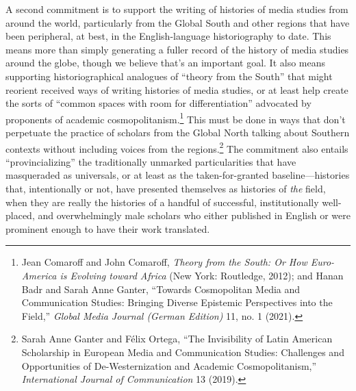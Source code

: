 \documentclass{tufte-handout}
\begin{document}
A second commitment is to support the writing of histories of media
studies from around the world, particularly from the Global South and
other regions that have been peripheral, at best, in the
English-language historiography to date. This means more than simply
generating a fuller record of the history of media studies around the
globe, though we believe that's an important goal. It also means
supporting historiographical analogues of ``theory from the South'' that
might reorient received ways of writing histories of media studies, or
at least help create the sorts of ``common spaces with room for
differentiation'' advocated by proponents of academic
cosmopolitanism.\footnote{Jean Comaroff and John Comaroff, \emph{Theory from the South: Or How
  Euro-America is Evolving toward Africa} (New York: Routledge, 2012);
  and Hanan Badr and Sarah Anne Ganter, ``Towards Cosmopolitan Media and
  Communication Studies: Bringing Diverse Epistemic Perspectives into
  the Field,'' \emph{Global Media Journal (German Edition)} 11, no. 1
  (2021).
} This must be done
in ways that don't perpetuate the practice of scholars from the Global
North talking about Southern contexts without including voices from the
regions.\footnote{Sarah Anne Ganter and Félix Ortega, ``The Invisibility of Latin
  American Scholarship in European Media and Communication Studies:
  Challenges and Opportunities of De-Westernization and Academic
  Cosmopolitanism,'' \emph{International Journal of Communication} 13
  \emph{} (2019).
} The commitment also
entails ``provincializing'' the traditionally unmarked particularities
that have masqueraded as universals, or at least as the
taken-for-granted baseline---histories that, intentionally or not, have
presented themselves as histories of \emph{the} field, when they are
really the histories of a handful of successful, institutionally
well-placed, and overwhelmingly male scholars who either published in
English or were prominent enough to have their work translated.
\end{document}
